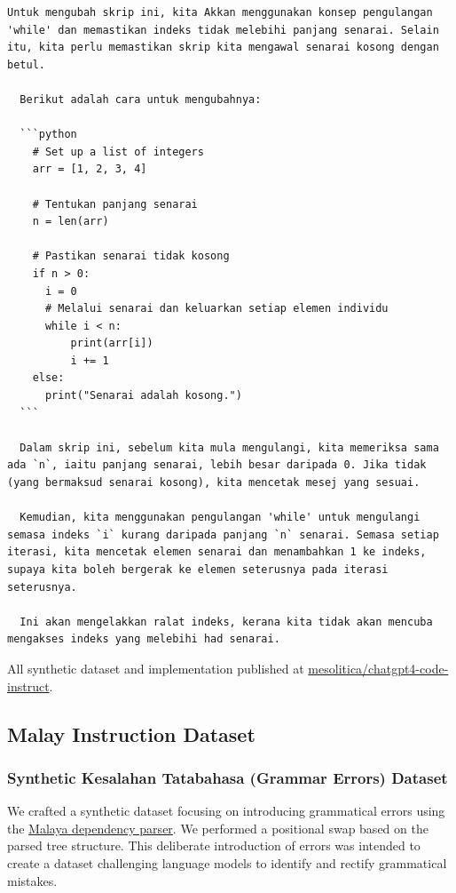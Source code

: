 \documentclass[preprint]{article}
\begin{document}
\begin{lstlisting}[breaklines=true]
  Untuk mengubah skrip ini, kita Akkan menggunakan konsep pengulangan 'while' dan memastikan indeks tidak melebihi panjang senarai. Selain itu, kita perlu memastikan skrip kita mengawal senarai kosong dengan betul.

  Berikut adalah cara untuk mengubahnya:

  ```python
    # Set up a list of integers
    arr = [1, 2, 3, 4]

    # Tentukan panjang senarai
    n = len(arr)

    # Pastikan senarai tidak kosong
    if n > 0:
      i = 0
      # Melalui senarai dan keluarkan setiap elemen individu
      while i < n:
          print(arr[i])
          i += 1
    else:
      print("Senarai adalah kosong.")
  ```

  Dalam skrip ini, sebelum kita mula mengulangi, kita memeriksa sama ada `n`, iaitu panjang senarai, lebih besar daripada 0. Jika tidak (yang bermaksud senarai kosong), kita mencetak mesej yang sesuai.

  Kemudian, kita menggunakan pengulangan 'while' untuk mengulangi semasa indeks `i` kurang daripada panjang `n` senarai. Semasa setiap iterasi, kita mencetak elemen senarai dan menambahkan 1 ke indeks, supaya kita boleh bergerak ke elemen seterusnya pada iterasi seterusnya.

  Ini akan mengelakkan ralat indeks, kerana kita tidak akan mencuba mengakses indeks yang melebihi had senarai.
\end{lstlisting}

All synthetic dataset and implementation published at \href{https://huggingface.co/datasets/mesolitica/chatgpt4-code-instruct}{mesolitica/chatgpt4-code-instruct}.

\subsection{Malay Instruction Dataset}

\subsubsection{Synthetic Kesalahan Tatabahasa (Grammar Errors) Dataset}

We crafted a synthetic dataset focusing on introducing grammatical errors using the \href{https://malaya.readthedocs.io/en/stable/load-dependency.html}{Malaya dependency parser}. We performed a positional swap based on the parsed tree structure. This deliberate introduction of errors was intended to create a dataset challenging language models to identify and rectify grammatical mistakes.
\end{document}
